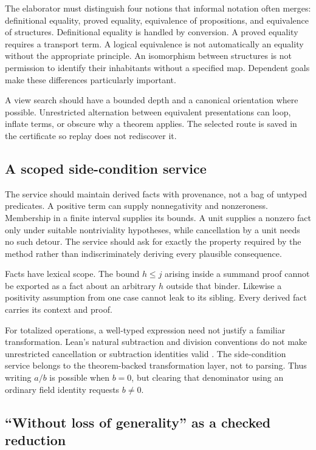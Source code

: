 \documentclass[11pt,a4paper]{article}
\begin{document}
The elaborator must distinguish four notions that informal notation often merges: definitional equality, proved equality, equivalence of propositions, and equivalence of structures. Definitional equality is handled by conversion. A proved equality requires a transport term. A logical equivalence is not automatically an equality without the appropriate principle. An isomorphism between structures is not permission to identify their inhabitants without a specified map. Dependent goals make these differences particularly important.

A view search should have a bounded depth and a canonical orientation where possible. Unrestricted alternation between equivalent presentations can loop, inflate terms, or obscure why a theorem applies. The selected route is saved in the certificate so replay does not rediscover it.

\subsection{A scoped side-condition service}

The service should maintain derived facts with provenance, not a bag of untyped predicates. A positive term can supply nonnegativity and nonzeroness. Membership in a finite interval supplies its bounds. A unit supplies a nonzero fact only under suitable nontriviality hypotheses, while cancellation by a unit needs no such detour. The service should ask for exactly the property required by the method rather than indiscriminately deriving every plausible consequence.

Facts have lexical scope. The bound $h\le j$ arising inside a summand proof cannot be exported as a fact about an arbitrary $h$ outside that binder. Likewise a positivity assumption from one case cannot leak to its sibling. Every derived fact carries its context and proof.

For totalized operations, a well-typed expression need not justify a familiar transformation. Lean's natural subtraction and division conventions do not make unrestricted cancellation or subtraction identities valid \cite{leantrust}. The side-condition service belongs to the theorem-backed transformation layer, not to parsing. Thus writing $a/b$ is possible when $b=0$, but clearing that denominator using an ordinary field identity requests $b\ne0$.

\subsection{``Without loss of generality'' as a checked reduction}
\end{document}
